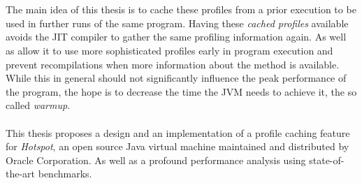 \\\\
The main idea of this thesis is to cache these profiles from a prior execution to be used in further runs of the same program. 
Having these \textit{cached profiles} available avoids the JIT compiler to gather the same profiling information again. As well as allow it to use more sophisticated profiles early in program execution and prevent recompilations when more information about the method is available. While this in general should not significantly influence the peak performance of the program, the hope is to decrease the time the JVM needs to achieve it, the so called \textit{warmup}.
\\\\
This thesis proposes a design and an implementation of a profile caching feature for \textit{Hotspot}, an open source Java virtual machine maintained and distributed by Oracle Corporation. As well as a profound performance analysis using state-of-the-art benchmarks.
